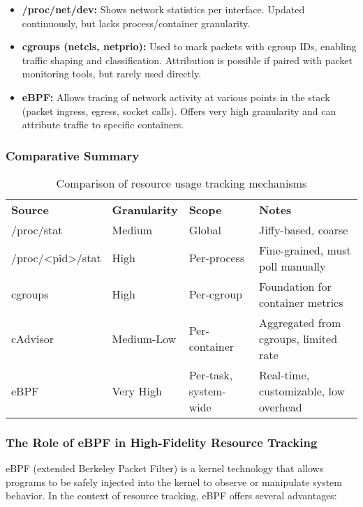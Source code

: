\begin{itemize}
    \item \textbf{/proc/net/dev:} Shows network statistics per interface. Updated continuously, but lacks process/container granularity.
    \item \textbf{cgroups (net\textunderscore cls, net\textunderscore prio):} Used to mark packets with cgroup IDs, enabling traffic shaping and classification. Attribution is possible if paired with packet monitoring tools, but rarely used directly.
    \item \textbf{eBPF:} Allows tracing of network activity at various points in the stack (packet ingress, egress, socket calls). Offers very high granularity and can attribute traffic to specific containers.
\end{itemize}

\subsubsection*{Comparative Summary}

\begin{table}[H]
\centering
\begin{tabular}{| m{3.2cm} | m{2cm}| m{3.6cm} | m{4cm} |}
\hline
\textbf{Source} & \textbf{Granularity} & \textbf{Scope} & \textbf{Notes} \\
\Xhline{1.5pt}
/proc/stat & Medium & Global & Jiffy-based, coarse \\
\hline
/proc/\textless pid\textgreater/stat & High & Per-process & Fine-grained, must poll manually \\
\hline
cgroups & High & Per-cgroup & Foundation for container metrics \\
\hline
cAdvisor & Medium-Low & Per-container & Aggregated from cgroups, limited rate \\
\hline
eBPF & Very High & Per-task, system-wide & Real-time, customizable, low overhead \\
\hline
\end{tabular}
\caption{Comparison of resource usage tracking mechanisms}
\end{table}

\subsubsection*{The Role of eBPF in High-Fidelity Resource Tracking}

eBPF (extended Berkeley Packet Filter) is a kernel technology that allows programs to be safely injected into the kernel to observe or manipulate system behavior. In the context of resource tracking, eBPF offers several advantages:

